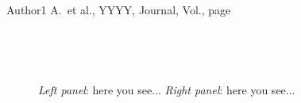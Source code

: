 \documentclass[letterpaper,11pt]{article}
\begin{document}
\smallskip\\

\smallskip\\

\smallskip\\
{\small
Author1 A.\ et al., YYYY, Journal, Vol., page \\
}

\smallskip\\


\begin{figure}[htp!]
\begin{center}
\hbox{
\hspace{0.5cm}
}
\end{center}
\caption{\footnotesize
{{\it Left panel}: here you see...
{\it Right panel}: here you see...}}
\label{fig1}
\end{figure}
\end{document}
